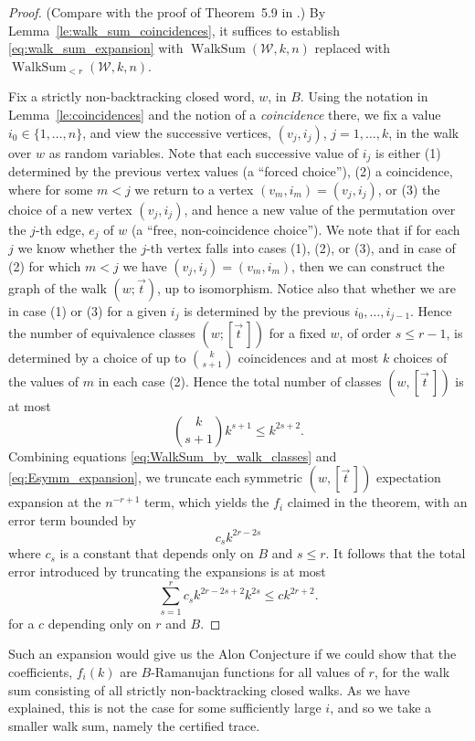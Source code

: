 \documentclass{memo-l}
\theoremstyle{plain}
\theoremstyle{definition}
\numberwithin{section}{chapter}
\numberwithin{equation}{chapter}
\DeclareMathOperator{\WalkSum}{WalkSum}
\theoremstyle{plain}
\theoremstyle{definition}
\newcommand\cW{\mathcal{W}}
\begin{document}
\begin{proof} 
(Compare with the proof 
of Theorem~5.9 in \cite{friedman_alon}.) 
By Lemma~\ref{le:walk_sum_coincidences}, it suffices to establish
\eqref{eq:walk_sum_expansion} with
$\WalkSum(\cW,k,n)$ replaced with
$\WalkSum_{<r}(\cW,k,n)$.

Fix a strictly non-backtracking closed word, $w$, in $B$.
Using the notation in 
Lemma~\ref{le:coincidences} and the notion of a {\em \gls{coincidence}} there,
we fix a value $i_0\in\{1,\ldots,n\}$, and view the successive vertices,
$(v_j,i_j)$, $j=1,\ldots,k$,
in the walk over $w$ as random variables.
Note that each successive value of $i_j$ 
is either (1) determined by the previous
vertex values (a ``forced choice''), 
(2) a coincidence, where for some $m<j$ we return
to a vertex $(v_m,i_m)=(v_j,i_j)$, or (3) the choice of a new vertex
$(v_j,i_j)$, and hence a new value of the permutation over the $j$-th edge,
$e_j$ of $w$ (a ``free, non-coincidence choice'').
We note that if for each $j$ we know whether the $j$-th vertex falls
into cases (1), (2), or (3), and in case of (2) for which $m<j$ we
have $(v_j,i_j)=(v_m,i_m)$, then we 
can construct the graph of the walk $(w;\vec t)$, up to isomorphism.
Notice also that whether we are in case (1) or (3) for a given $i_j$
is determined by the previous $i_0,\ldots,i_{j-1}$.
Hence the number of equivalence classes 
$(w;[\vec t\,])$ for a fixed $w$, of order $s\le r-1$, is determined
by a choice of up to $\binom{k}{s+1}$ coincidences and at most
$k$ choices of the values of $m$ in each case (2).  Hence the total number
of classes $(w,[\vec t\,])$ is at most
$$
\binom{k}{s+1} k^{s+1} \le  k^{2s+2}.
$$
Combining equations
\ref{eq:WalkSum_by_walk_classes} and \ref{eq:Esymm_expansion}, we truncate
each symmetric $(w,[\vec t\,])$ expectation expansion at the 
$n^{-r+1}$ term, which yields the $f_i$ claimed in the theorem,
with an error term bounded
by
$$
c_s k^{2r -2s } 
$$
where $c_s$ is a constant that depends only on $B$ and $s\le r$.
It follows that the total error introduced by
truncating the expansions is at most
$$
\sum_{s=1}^r c_s k^{2r-2s+2} k^{2s}   \le c k^{2r+2}.
$$
for a $c$ depending only on $r$ and $B$.
\end{proof}

Such an expansion would give us the Alon Conjecture if we could show that
the coefficients, \( f_i(k) \) are \(B\)-Ramanujan functions for all values
of \(r\), for the walk sum consisting of all strictly non-backtracking
closed walks.
As we have explained, this is not the case for some sufficiently large
$i$, and so we take a smaller walk sum, namely the certified trace.
%
%
%
%
\end{document}
